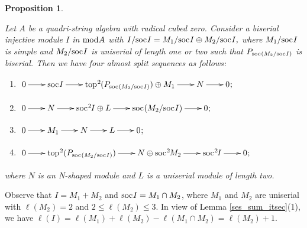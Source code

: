 \documentclass[10pt]{amsart}
\newtheorem{Prop}[Theo]{Proposition}
\theoremstyle{definition}
\newcommand{\mmod}{{\rm mod}}
\newcommand{\soc}{{\rm soc}\hspace{.5pt}}
\newcommand{\ntop}{{\rm top}\hspace{.5pt}}
\newcommand{\hp}{\hspace{.5pt}}
\begin{document}
\begin{Prop}\label{ass_14_2} 

Let $A$ be a quadri-string algebra with radical cubed zero. Consider a biserial injective module $I$ in $\mmod A$ with $I/\soc I=M_1/\soc I\oplus M_2/\soc I,$ where $M_1/\soc I$ is simple and $M_2/\soc I$ is uniserial of length one or two such that $P_{\soc (M_2/\soc I)}$ is biserial. Then we have four almost split sequences as follows$\hp:$ 

\begin{enumerate}[$(1)$]

\vspace{-2.5pt}

\item $\xymatrixcolsep{20pt}\xymatrix{0\ar[r] & \soc I \ar[r] & 
\ntop^2\hspace{-.5pt}(P_{\soc (M_2/\soc I)})\oplus M_1 \ar[r] & N \ar[r] & 0\hp ;}$ 

\vspace{-2.5pt}

\item $\xymatrixcolsep{20pt}\xymatrix{0\ar[r] & N  \ar[r] & \soc^2\hspace{-1pt}I \oplus L \ar[r] & \soc(M_2/\soc I) \ar[r] & 0\hp ;}$

\vspace{-2.5pt}

\item $\xymatrixcolsep{20pt}\xymatrix{0\ar[r] & M_1  \ar[r] & N \ar[r] & L \ar[r] & 0\hp ;}$

\vspace{-2.5pt}

\item $\xymatrixcolsep{20pt}\xymatrix{0\ar[r] & \ntop^2(P_{\soc(M_2/\soc I)}) \ar[r] & N\oplus \soc^2\hspace{-1pt} M_2 \ar[r] & \soc^2\hspace{-1pt}I \ar[r] & 0\hp ;}$

\end{enumerate}

\vspace{-4pt}

\noindent where $N$ is an N-shaped module and $L$ is a uniserial module of length two.

\end{Prop}

\vspace{-1.5pt}

 Observe that $I=M_1+M_2$ and $\soc I=M_1\cap M_2$, where $M_1$ and $M_2$ are uniserial with $\ell(M_2)=2$ and $2\le \ell(M_2)\le 3.$ In view of Lemma \ref{ses_sum_itsec}(1), we have
$\ell(I)=\ell(M_1)+\ell(M_2)-\ell(M_1\cap M_2)=\ell(M_2)+1.$ 
\end{document}
